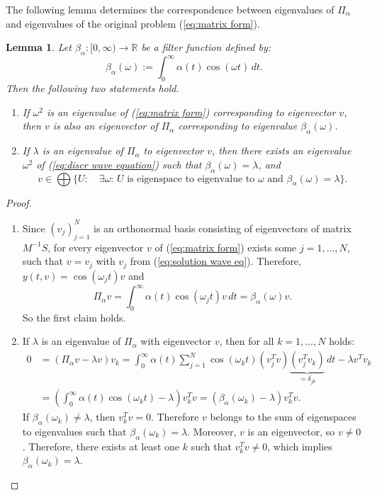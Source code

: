\documentclass[a4paper,11pt,bibliography=totoc,listof=totoc,headinclude=true,cleardoublepage=empty,oneside]{scrbook}
\newtheorem{lemma}[theorem]{Lemma}
\newcommand{\R}{\mathbb{R}}
\renewcommand{\eqref}[1]{(\ref{#1})}
\begin{document}
The following lemma determines the correspondence between eigenvalues of $\Pi_\alpha$ and eigenvalues of the original problem \eqref{eq:matrix form}.

\begin{lemma}
    Let $\beta_\alpha : [0, \infty) \rightarrow \R$ be a filter function defined by:
    \begin{equation}\label{eq:cont filter function}
        \beta_\alpha(\omega) := \int_0^\infty \alpha(t) \cos(\omega t) \,dt. 
    \end{equation}
    Then the following two statements hold.
    \begin{enumerate}
        \item If $\omega^2$ is an eigenvalue of \eqref{eq:matrix form} corresponding to eigenvector $v$, then $v$ is also an eigenvector of $\Pi_\alpha$ corresponding to eigenvalue $\beta_\alpha(\omega)$. 
        \item If $\lambda$ is an eigenvalue of $\Pi_\alpha$ to eigenvector $v$, then there exists an eigenvalue $\omega^2$ of \eqref{eq:discr wave equation} such that $\beta_\alpha (\omega) = \lambda$, and 
        \begin{equation*}
            v \in \bigoplus\{ U : \quad \exists \omega: \, U \text{ is eigenspace to eigenvalue to } \omega \text{ and } \beta_\alpha(\omega) = \lambda\}.
        \end{equation*}
    \end{enumerate}
\end{lemma}
\begin{proof}
    \begin{enumerate}
        \item Since $(v_j)_{j=1}^N$ is an orthonormal basis consisting of eigenvectors of matrix $M^{-1}S$, for every eigenvector $v$ of \eqref{eq:matrix form} exists some $j=1, \dots, N$, such that $v = v_j$ with $v_j$ from \eqref{eq:solution wave eq}. Therefore, $y(t, v) = \cos(\omega_j t)v$ and 
        \begin{equation*}
            \Pi_\alpha v = \int_0^\infty \alpha(t) \cos(\omega_j t) v \, dt = \beta_\alpha(\omega) v.
        \end{equation*}
        So the first claim holds.
        \item If $\lambda$ is an eigenvalue of $\Pi_\alpha$ with eigenvector $v$, then for all $k=1, \dots, N$ holds:
        \begin{align*}
             0 &= (\Pi_\alpha v - \lambda v)v_k = \int_0^\infty \alpha(t) \sum_{j=1}^N \cos(\omega_k t) (v_j^T v)\underbrace{(v_j^T v_k)}_{=\delta_{jk}} \, dt - \lambda v^Tv_k \\ &= \left(\int_0^\infty \alpha(t) \cos(\omega_kt) - \lambda \right)v_k^T v = (\beta_\alpha(\omega_k) - \lambda)v_k^T v.
        \end{align*}
        If $\beta_\alpha (\omega_k)\neq \lambda$, then $v_k^Tv = 0$. Therefore $v$ belongs to the sum of eigenspaces to eigenvalues such that $\beta_\alpha(\omega_k) = \lambda$. Moreover, $v$ is an eigenvector, so $v\neq 0$. Therefore, there exists at least one $k$ such that $v_k^T v \neq 0$, which implies $\beta_\alpha (\omega_k) = \lambda$. 
    \end{enumerate}
\end{proof}
\end{document}

